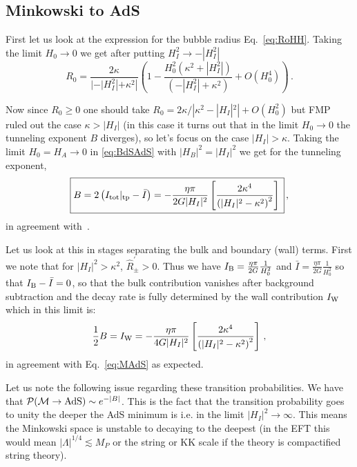 \documentclass[a4paper,11pt]{article}
\numberwithin{equation}{section}
\newcommand{\citep}{\cite}
\numberwithin{equation}{section}
\begin{document}
\subsection{Minkowski to AdS}

First let us look at the expression for the bubble radius Eq.~\eqref{eq:RoHH}. 
Taking the limit $H_{0}\rightarrow0$ we get after putting $H_{I}^{2}\rightarrow-|H_{I}^{2}|$
\[
R_{0}=\frac{2\kappa}{|-|H_{I}^{2}|+\kappa^{2}|}\left(1-\frac{H_{0}^{2}(\kappa^{2}+|H_{I}^{2}|)}{(-|H_{I}^{2}|+\kappa^{2})}+O\left(H_{0}^{4}\right)\right) \,.
\]

Now since $R_{0}\geq0$ one should take $R_{0}=2\kappa/|\kappa^{2}-|H_{I}|^{2}|+O(H_{0}^{2})$
but FMP ruled out the case $\kappa>|H_{I}|$ (in this case it turns
out that in the limit $H_{0}\rightarrow0$ the tunneling exponent
$B$ diverges), so let's focus on the case $|H_{I}|>\kappa$. Taking
the limit $H_{0}=H_A\rightarrow 0$ in \eqref{eq:BdSAdS} with
$|H_B|^2=|H_{I}|^{2}$ we get for the tunneling exponent,
\begin{equation}
\boxed{\\ \\
B=2\left( I_{{\rm tot}}|_{{\rm tp}}-\bar{I}\right)=-\frac{\eta\pi}{2G|H_{I}|^{2}}\left[\frac{2\kappa^{4}}{\left(|H_{I}|^{2}-\kappa^{2}\right)^{2}}\right] \\ } \,,\label{eq:MAdS}
\end{equation}
in agreement with~\citep{Fischler:1990pk,Coleman:1980aw}.

Let us look at this in stages separating the bulk and boundary (wall) terms. 
First we note that for $|H_{I}|^{2}>\kappa^{2}$, $\hat{R}_{\pm}^{'}>0$.
Thus we have  $I_{{\rm B}}=\frac{\eta\pi}{2G}\frac{1}{H_{0}^{2}}$
and $\bar{I}=\frac{\eta\pi}{2G}\frac{1}{H_{0}^{2}}$ so that $I_{{\rm B}}-\bar{I}=0$,
so that the bulk contribution vanishes after background subtraction
and the decay rate is fully determined by the wall contribution $ I_{{\rm W}}$ which in this limit is:
\begin{equation}
\frac{1}{2}B=I_{{\rm W}}=-\frac{\eta\pi}{4G|H_{I}|^{2}}\left[\frac{2\kappa^{4}}{\left(|H_{I}|^{2}-\kappa^{2}\right)^{2}}\right] \,,\label{eq:MAdS2}
\end{equation}
in agreement with Eq.~\eqref{eq:MAdS} as expected.
 
 

Let us note the following issue regarding these transition probabilities.  We have that
${\mathcal P}({\mathcal M}\rightarrow{\rm AdS})\sim e^{-|B|}$. This is the fact
that the transition probability goes to unity the deeper the AdS minimum
is i.e. in the limit $|H_{I}|^{2}\rightarrow\infty$. This  means the Minkowski space is unstable to decaying to the
deepest (in the EFT this would mean $|\Lambda|^{1/4}\lesssim M_{P}$
or the string or KK scale if the theory is compactified string theory).
\end{document}
